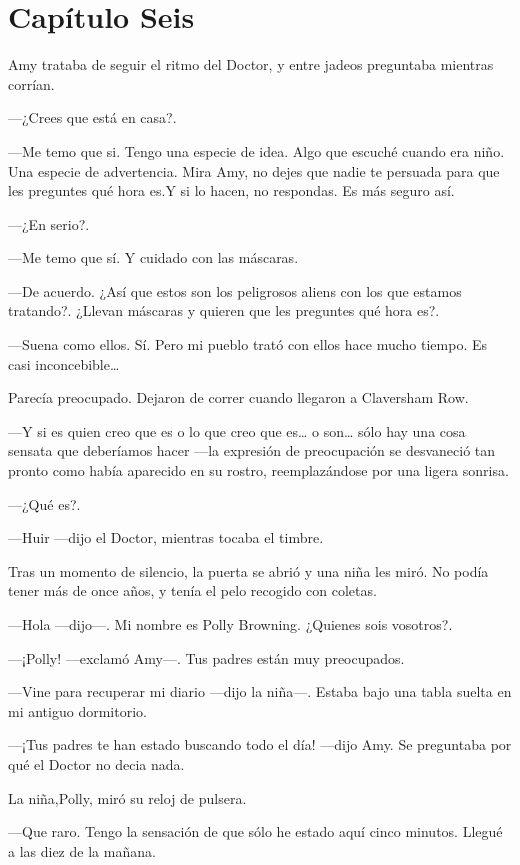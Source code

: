 \chapter*{Capítulo Seis} 

Amy trataba de seguir el ritmo del Doctor, y entre jadeos preguntaba mientras corrían.

---¿Crees que está en casa?.

---Me temo que si. Tengo una especie de idea. Algo que escuché cuando era niño. Una especie de advertencia. Mira Amy, no dejes que nadie te persuada para que les preguntes qué hora es.Y si lo hacen, no respondas. Es más seguro así.

---¿En serio?.

---Me temo que sí. Y cuidado con las máscaras.

---De acuerdo. ¿Así que estos son los peligrosos aliens con los que estamos tratando?. ¿Llevan máscaras y quieren que les preguntes qué hora es?.

---Suena como ellos. Sí. Pero mi pueblo trató con ellos hace mucho tiempo. Es casi inconcebible\ldots{}

Parecía preocupado. Dejaron de correr cuando llegaron a Claversham Row.

---Y si es quien creo que es o lo que creo que es\ldots{} o son\ldots{} sólo hay una cosa sensata que deberíamos hacer ---la expresión de preocupación se desvaneció tan pronto como había aparecido en su rostro, reemplazándose por una ligera sonrisa.

---¿Qué es?.

---Huir ---dijo el Doctor, mientras tocaba el timbre.

Tras un momento de silencio, la puerta se abrió y una niña les miró. No podía tener más de once años, y tenía el pelo recogido con coletas.

---Hola ---dijo---. Mi nombre es Polly Browning. ¿Quienes sois vosotros?.

---¡Polly! ---exclamó Amy---. Tus padres están muy preocupados.

---Vine para recuperar mi diario ---dijo la niña---. Estaba bajo una tabla suelta en mi antiguo dormitorio.

---¡Tus padres te han estado buscando todo el día! ---dijo Amy. Se preguntaba por qué el Doctor no decia nada.

La niña,Polly, miró su reloj de pulsera.

---Que raro. Tengo la sensación de que sólo he estado aquí cinco minutos. Llegué a las diez de la mañana.

